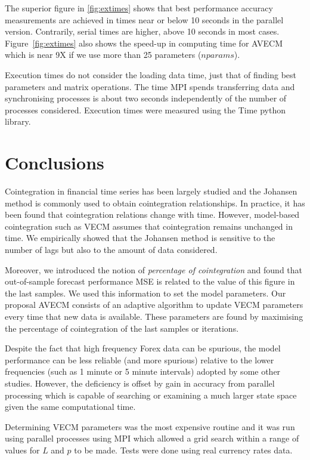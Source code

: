 The superior figure in \ref{fig:extimes} shows that best performance accuracy
measurements are achieved in times near or below 10 seconds in the parallel
version. Contrarily, serial times are higher, above 10 seconds in most cases.
Figure~\ref{fig:extimes} also shows the speed-up in computing time for AVECM
which is near 9X if we use more than 25 parameters ($nparams$).

Execution times do not consider the loading data time, just that of finding best
parameters and matrix operations. The time MPI spends transferring data and
synchronising processes is about two seconds independently of the number of
processes considered. Execution times were measured using the Time python
library.

\section{Conclusions}
\label{sec:conclusions}
Cointegration in financial time series has been largely studied and the Johansen
method is commonly used to obtain cointegration relationships. In practice, it
has been found that cointegration relations change with time. However,
model-based cointegration such as VECM assumes that cointegration remains
unchanged in time. We empirically showed that the Johansen method is sensitive
to the number of lags but also to the amount of data considered.

Moreover, we introduced the notion of {\em percentage of cointegration\/} and
found that out-of-sample forecast performance MSE is related to the value of
this figure in the last samples.  We used this information to set the model
parameters.  Our proposal AVECM consists of an adaptive algorithm to update VECM
parameters every time that new data is available. These parameters are found by
maximising the percentage of cointegration of the last samples or iterations.

Despite the fact that high frequency Forex data can be spurious, the model
performance can be less reliable (and more spurious) relative to the lower
frequencies (such as 1 minute or 5 minute intervals) adopted by some other
studies. However, the deficiency is offset by gain in accuracy from parallel
processing which is capable of searching or examining a much larger state space
given the same computational time.

Determining VECM parameters was the most expensive routine and it was run using
parallel processes using MPI which allowed a grid search within a range of
values for $L$ and $p$ to be made.  Tests were done using real currency rates
data.  

